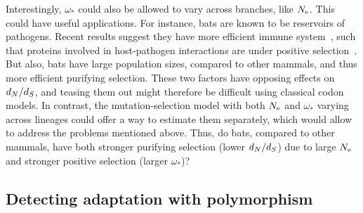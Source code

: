 Interestingly, $\omega_*$ could also be allowed to vary across branches, like $N_{\text{e}}$.
This could have useful applications.
For instance, bats are known to be reservoirs of pathogens.
Recent results suggest they have more efficient immune system~\citep{Baker2013,Pavlovich2018}, such that proteins involved in host-pathogen interactions are under positive selection~\citep{Hawkins2019,Vandewege2020}.
But also, bats have large population sizes, compared to other mammals, and thus more efficient purifying selection.
These two factors have opposing effects on $d_N / d_S$, and teasing them out might therefore be difficult using classical codon models.
In contrast, the mutation-selection model with both $N_{\text{e}}$ and $\omega_*$ varying across lineages could offer a way to estimate them separately, which would allow to address the problems mentioned above.
Thus, do bats, compared to other mammals, have both stronger purifying selection (lower $d_N / d_S$) due to large $N_{\text{e}}$ and stronger positive selection (larger $\omega_*$)?

\subsection{Detecting adaptation with polymorphism}
\label{subsec:detecting-adaptation-with-polymorphism}

